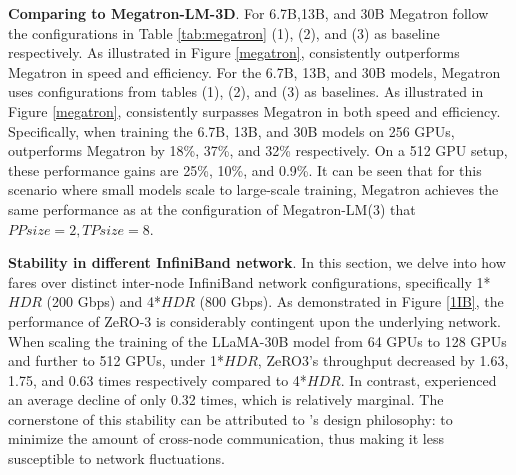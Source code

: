 \noindent\textbf{Comparing to Megatron-LM-3D}.
For 6.7B,13B, and 30B Megatron follow the configurations in Table \ref{tab:megatron} (1), (2), and (3) as baseline respectively. As illustrated in Figure \ref{megatron}, \SysName consistently outperforms Megatron in speed and efficiency. For the 6.7B, 13B, and 30B models, Megatron uses configurations from tables (1), (2), and (3) as baselines. As illustrated in Figure \ref{megatron}, \SysName consistently surpasses Megatron in both speed and efficiency. Specifically, when training the 6.7B, 13B, and 30B models on 256 GPUs, \SysName outperforms Megatron by 18\%, 37\%, and 32\% respectively. On a 512 GPU setup, these performance gains are 25\%, 10\%, and 0.9\%. It can be seen that for this scenario where small models scale to large-scale training, Megatron achieves the same performance as \SysName at the configuration of Megatron-LM(3) that $PP size = 2, TP size = 8$.








\noindent\textbf{Stability in different InfiniBand network}.
In this section, we delve into how \SysName fares over distinct inter-node InfiniBand network configurations, specifically 1*$HDR$ (200 Gbps) and 4*$HDR$ (800 Gbps). As demonstrated in Figure \ref{1IB}, the performance of ZeRO-3 is considerably contingent upon the underlying network. When scaling the training of the LLaMA-30B model from 64 GPUs to 128 GPUs and further to 512 GPUs, under 1*$HDR$, ZeRO3's throughput decreased by 1.63, 1.75, and 0.63 times respectively compared to 4*$HDR$. In contrast, \SysName experienced an average decline of only 0.32 times, which is relatively marginal. The cornerstone of this stability can be attributed to \SysName's design philosophy: to minimize the amount of cross-node communication, thus making it less susceptible to network fluctuations.


